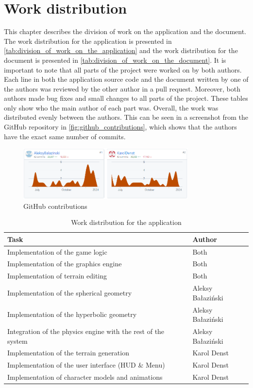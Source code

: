 \chapter{Work distribution}\label{ch:division_of_work}
This chapter describes the division of work on the application and the document.
The work distribution for the application is presented in \autoref{tab:division_of_work_on_the_application} and the work distribution for the document is presented in \autoref{tab:division_of_work_on_the_document}.
It is important to note that all parts of the project were worked on by both authors.
Each line in both the application source code and the document written by one of the authors was reviewed by the other author in a pull request.
Moreover, both authors made bug fixes and small changes to all parts of the project.
These tables only show who the main author of each part was.
Overall, the work was distributed evenly between the authors.
This can be seen in a screenshot from the GitHub repository in \autoref{fig:github_contributions}, which shows that the authors have the exact same number of commits.

\begin{figure}[h]
    \centering
    \includegraphics[width=0.8\textwidth]{chapters/work_distribution/resources/github_contributions.png}
    \caption{GitHub contributions}
    \label{fig:github_contributions}
\end{figure}

\begin{table}[h]
    \centering
    \begin{tabular}{|l|l|}
    \hline
    Task     & Author        \\ \hline
    Implementation of the game logic & Both \\
    Implementation of the graphics engine & Both \\
    Implementation of terrain editing & Both \\
    Implementation of the spherical geometry & Aleksy Bałaziński      \\
    Implementation of the hyperbolic geometry & Aleksy Bałaziński      \\
    Integration of the physics engine with the rest of the system & Aleksy Bałaziński      \\
    Implementation of the terrain generation & Karol Denst      \\
    Implementation of the user interface (HUD \& Menu) & Karol Denst      \\
    Implementation of character models and animations & Karol Denst      \\
    \hline
    \end{tabular}
    \caption{Work distribution for the application}
    \label{tab:division_of_work_on_the_application}
\end{table}
    
